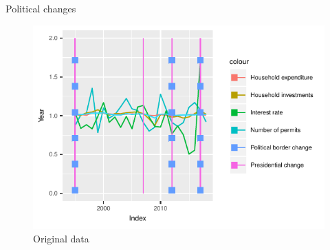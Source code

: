 \documentclass[11pt,ignorenonframetext,]{beamer}
\begin{document}
\begin{frame}{Political changes}
\protect\hypertarget{political-changes}{}

\FloatBarrier

\tiny

\begin{figure}[!htbp]

{\centering \includegraphics{presentation_files/figure-beamer/unnamed-chunk-14-1} 

}

\caption{Original data}\label{fig:unnamed-chunk-14}
\end{figure}

\normalsize

\FloatBarrier

\end{frame}
\end{document}
